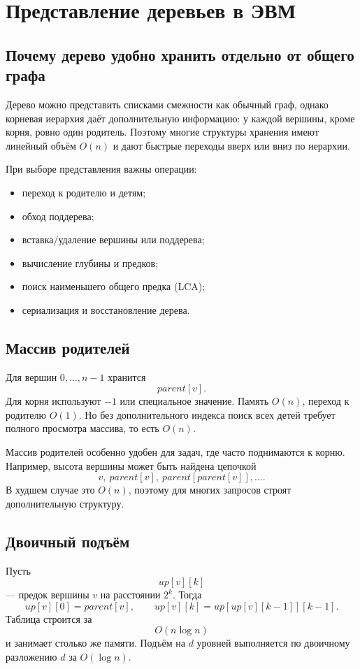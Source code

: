 \section{Представление деревьев в ЭВМ}
\label{sec:tree-representation}

\subsection{Почему дерево удобно хранить отдельно от общего графа}

Дерево можно представить списками смежности как обычный граф, однако корневая
иерархия даёт дополнительную информацию: у каждой вершины, кроме корня, ровно
один родитель. Поэтому многие структуры хранения имеют линейный объём
$O(n)$ и дают быстрые переходы вверх или вниз по иерархии.

При выборе представления важны операции:
\begin{itemize}
 \item переход к родителю и детям;
 \item обход поддерева;
 \item вставка/удаление вершины или поддерева;
 \item вычисление глубины и предков;
 \item поиск наименьшего общего предка (LCA);
 \item сериализация и восстановление дерева.
\end{itemize}

\subsection{Массив родителей}

Для вершин $0,\ldots,n-1$ хранится
\[
    parent[v].
\]
Для корня используют $-1$ или специальное значение. Память $O(n)$, переход к
родителю $O(1)$. Но без дополнительного индекса поиск всех детей требует полного
просмотра массива, то есть $O(n)$.

Массив родителей особенно удобен для задач, где часто поднимаются к корню.
Например, высота вершины может быть найдена цепочкой
\[
    v,\ parent[v],\ parent[parent[v]],\ldots.
\]
В худшем случае это $O(n)$, поэтому для многих запросов строят дополнительную
структуру.

\subsection{Двоичный подъём}

Пусть
\[
    up[v][k]
\]
--- предок вершины $v$ на расстоянии $2^k$. Тогда
\[
    up[v][0]=parent[v],
    \qquad
    up[v][k]=up[up[v][k-1]][k-1].
\]
Таблица строится за
\[
    O(n\log n)
\]
и занимает столько же памяти. Подъём на $d$ уровней выполняется по двоичному
разложению $d$ за $O(\log n)$.

